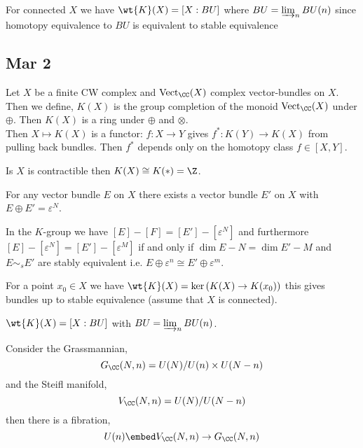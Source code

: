 \documentclass[12pt]{extarticle}
\begin{document}
\begin{prop}
For connected $X$ we have $\wt{K}(X) = [X : BU]$ where $BU = \varinjlim_{n} BU(n)$ since homotopy equivalence to $BU$ is equivalent to stable equivalence 
\end{prop}

\subsection{Mar 2}

Let $X$ be a finite CW complex and $\Vect_\CC(X)$ complex vector-bundles on $X$. Then we define,  $K(X)$ is the group completion of the monoid $\Vect_{\CC}(X)$ under $\oplus$. Then $K(X)$ is a ring under $\oplus$ and $\otimes$.
\bigskip\\
Then $X \mapsto K(X)$ is a functor: $f : X \to Y$ gives $f^* : K(Y) \to K(X)$ from pulling back bundles. Then $f^*$ depends only on the homotopy class $f \in [X, Y]$.
\bigskip\\
\begin{rmk}
Is $X$ is contractible then $K(X) \cong K(*) = \Z$.
\end{rmk}

\begin{prop}
For any vector bundle $E$ on $X$ there exists a vector bundle $E'$ on $X$ with $E \oplus E' = \varepsilon^{N}$. 
\end{prop}

\begin{cor}
In the $K$-group we have $[E] - [F] = [E'] - [\varepsilon^N]$ and furthermore $[E] - [\varepsilon^N] = [E'] - [\varepsilon^M]$ if and only if $\dim{E} - N = \dim{E'} - M$ and $E \sim_s E'$ are stably equivalent i.e. $E \oplus \varepsilon^n \cong E' \oplus \varepsilon^m$.  
\end{cor}

\begin{defn}
For a point $x_0 \in X$ we have $\wt{K}(X) = \ker{(K(X) \to K(x_0))}$ this gives bundles up to stable equivalence (assume that $X$ is connected). 
\end{defn}

\begin{prop}
$\wt{K}(X) = [X : BU]$ with $BU = \varinjlim_n BU(n)$.
\end{prop}

\begin{rmk}
Consider the Grassmannian,
\[ G_\CC(N, n) = U(N) / U(n) \times U(N-n) \]
and the Steifl manifold,
\[ V_\CC(N, n) = U(N) / U(N-n) \]
then there is a fibration,
\[ U(n) \embed V_\CC(N, n) \to G_\CC(N, n) \]
\end{rmk}
\end{document}
